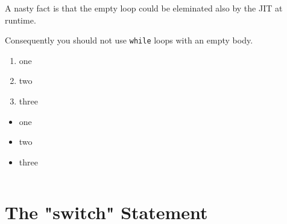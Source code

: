 A nasty fact is that the empty loop could be eleminated also by the JIT at runtime.

Consequently you should not use \lstinline|while| loops with an empty body.



\autocite{}

\lipsum[1]

\begin{enumerate}[label=P\arabic*.]
\item{one}
\item{two}
\item{three}
\end{enumerate}

\begin{itemize}[nosep]
\item{one}
\item{two}
\item{three}
\end{itemize}

\begin{lstlisting}[numbers=left]
\end{lstlisting}



\section{The "switch" Statement}\label{sec:TheSwitchStatement}

